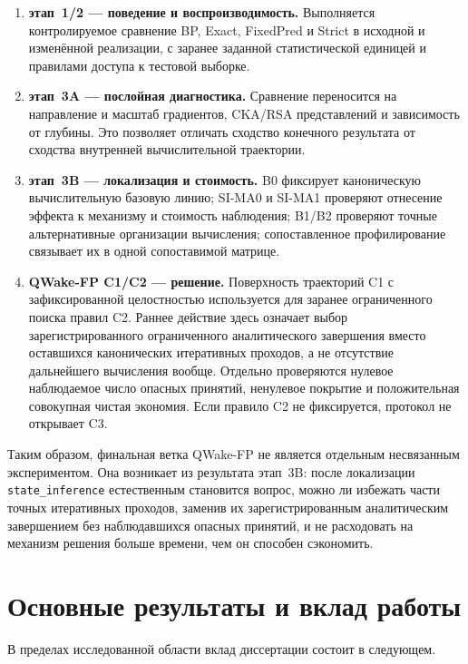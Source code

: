 \begin{enumerate}
  \item \textbf{этап~1/2 --- поведение и воспроизводимость.} Выполняется
  контролируемое сравнение BP, Exact, FixedPred и Strict в исходной и
  изменённой реализации, с заранее заданной статистической единицей и правилами
  доступа к тестовой выборке.

  \item \textbf{этап~3A --- послойная диагностика.} Сравнение переносится на
  направление и масштаб градиентов, CKA/RSA представлений и зависимость от
  глубины. Это позволяет отличать сходство конечного результата от сходства
  внутренней вычислительной траектории.

  \item \textbf{этап~3B --- локализация и стоимость.} B0 фиксирует каноническую
  вычислительную базовую линию; SI-MA0 и SI-MA1 проверяют отнесение эффекта к
  механизму и стоимость наблюдения; B1/B2 проверяют точные альтернативные
  организации вычисления; сопоставленное профилирование связывает их в одной
  сопоставимой матрице.

  \item \textbf{QWake-FP C1/C2 --- решение.} Поверхность траекторий C1 с
  зафиксированной целостностью используется для заранее ограниченного поиска
  правил C2. Раннее действие здесь означает выбор зарегистрированного ограниченного
  аналитического завершения вместо оставшихся канонических итеративных проходов, а не
  отсутствие дальнейшего вычисления вообще. Отдельно проверяются нулевое
  наблюдаемое число опасных принятий, ненулевое покрытие и положительная
  совокупная чистая экономия. Если правило C2 не фиксируется, протокол не
  открывает C3.
\end{enumerate}

Таким образом, финальная ветка QWake-FP не является отдельным несвязанным
экспериментом. Она возникает из результата этап~3B: после локализации
\texttt{state\_inference} естественным становится вопрос, можно ли избежать
части точных итеративных проходов, заменив их зарегистрированным аналитическим
завершением без наблюдавшихся опасных принятий, и не расходовать на механизм
решения больше времени, чем он способен сэкономить.

\section{Основные результаты и вклад работы}
\label{sec:intro-contributions}

В пределах исследованной области вклад диссертации состоит в следующем.


